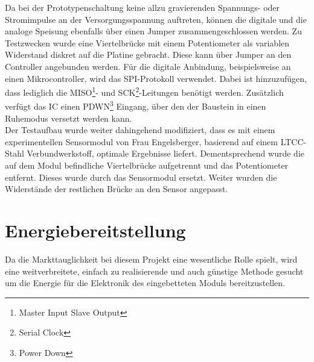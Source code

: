 \documentclass[12pt]{scrreprt} %
\begin{document}
Da bei der Prototypenschaltung keine allzu gravierenden Spannungs- oder Stromimpulse an der Versorgungsspannung auftreten, können die digitale und die analoge Speisung ebenfalls über einen Jumper zusammengeschlossen werden. Zu Testzwecken wurde eine Viertelbrücke mit einem Potentiometer als variablen Widerstand diskret auf die Platine gebracht. Diese kann über Jumper an den Controller angebunden werden. Für die digitale Anbindung, beispielsweise an einen Mikrocontroller, wird das SPI-Protokoll verwendet. Dabei ist hinzuzufügen, dass lediglich die MISO\footnote{Master Input Slave Output}- und SCK\footnote{Serial Clock}-Leitungen benötigt werden. Zusätzlich verfügt das IC einen PDWN\footnote{Power Down} Eingang, über den der Baustein in einen Ruhemodus versetzt werden kann.\\
Der Testaufbau wurde weiter dahingehend modifiziert, dass es mit einem experimentellen Sensormodul von Frau Engelsberger, basierend auf einem LTCC-Stahl Verbundwerkstoff, optimale Ergebnisse liefert. Dementsprechend wurde die auf dem Modul befindliche Viertelbrücke aufgetrennt und das Potentiometer entfernt. Dieses wurde durch das Sensormodul ersetzt. Weiter wurden die Widerstände der restlichen Brücke an den Sensor angepasst.

\section{Energiebereitstellung}
\label{chap:4.2}
Da die Markttauglichkeit bei diesem Projekt eine wesentliche Rolle spielt, wird eine weitverbreitete, einfach zu realisierende und auch günstige Methode gesucht um die Energie für die Elektronik des eingebetteten Moduls bereitzustellen.
\end{document}
